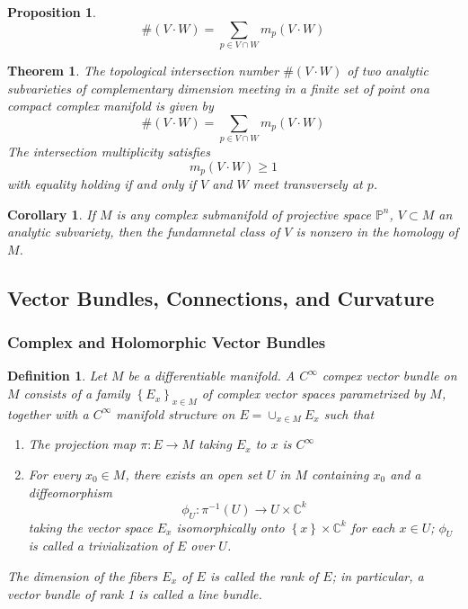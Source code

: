 \documentclass{article}
\newtheorem{thm}{Theorem}
\newtheorem{defn}{Definition}
\newtheorem{prop}{Proposition}
\newtheorem{cor}{Corollary}
\begin{document}
\begin{prop}
	\[
		\# \left( V \cdot W \right) = \sum_{p \in V \cap W} m_p \left( V \cdot W \right)
	\]
	
\end{prop}

\begin{thm}
	The topological intersection number $ \# \left( V \cdot W \right)$ of two analytic subvarieties of complementary dimension meeting in a finite set of point ona compact complex manifold is given by 
	\[
		\# \left( V \cdot W \right) = \sum_{p \in V \cap W} m_p (V \cdot W)
	\]
	The intersection multiplicity satisfies
	\[
		m_p \left( V \cdot W \right) \geq 1
	\]
	with equality holding if and only if $V$ and $W$ meet transversely at $p$.
\end{thm}

\begin{cor}
	If $M$ is any complex submanifold of projective space $ \mathbb{P}^n$, $ V \subset M$ an analytic subvariety, then the fundamnetal class of $V$ is nonzero in the homology of $M$.
\end{cor}

\subsection{Vector Bundles, Connections, and Curvature}
\subsubsection{Complex and Holomorphic Vector Bundles}

\begin{defn}
	Let $M$ be a differentiable manifold. A $ C^{\infty}$ compex vector bundle on $M$ consists of a family $ \left\{ E_x \right\}_{x \in M}$ of complex vector spaces parametrized by $M$, together with a $ C^{\infty}$ manifold structure on $E = \cup_{x \in M} E_x$ such that
	\begin{enumerate}
		\item The projection map $ \pi: E \to M$ taking $E_x$ to $x$ is $ C^{\infty}$
		\item For every $x_0 \in M$, there exists an open set $U$ in $M$ containing $x_0$ and a diffeomorphism
			\[
				\phi_U: \pi^{-1} \left( U \right) \to U \times \mathbb{C}^k
			\]
			taking the vector space $E_x$ isomorphically onto $ \left\{ x \right\} \times \mathbb{C}^k$ for each $x \in U$; $ \phi_U$ is called a \textit{trivialization} of $E$ over $U$.
	\end{enumerate}
	The dimension of the \textit{fibers} $E_x$ of $E$ is called the \textit{rank} of $E$; in particular, a vector bundle of rank 1 is called a \textit{line bundle}.
\end{defn}
\end{document}
